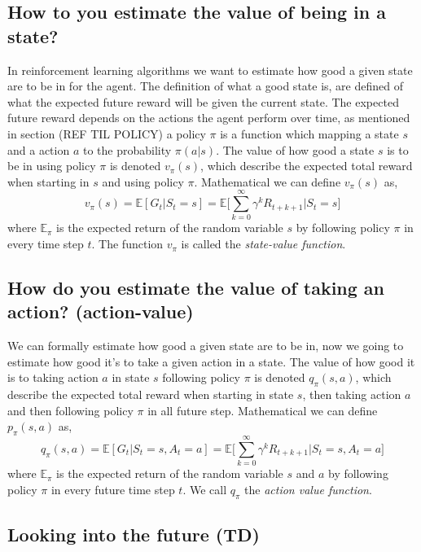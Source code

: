 \documentclass[11pt]{article}
\begin{document}
\subsection{How to you estimate the value of being in a state?}

In reinforcement learning algorithms we want to estimate how good a given state are to be in for the agent. The definition of what a good state is, are defined of what the expected future reward will be given the current state. The expected future reward depends on the actions the agent perform over time, as mentioned in section (REF TIL POLICY) a policy $\pi$ is a function which mapping a state $s$ and a action $a$ to the probability $\pi(a|s)$.
The value of how good a state $s$ is to be in using policy $\pi$ is denoted $v_{\pi}(s)$, which describe the expected total reward when starting in $s$ and using policy $\pi$. Mathematical we can define $v_{\pi}(s)$ as,
\begin{equation}
    v_{\pi}(s) = \mathds{E}[G_{t} | S_{t} = s] = \mathds{E}\bigg[\sum_{k = 0}^{\infty} \gamma^{k} R_{t + k + 1} \bigg| S_{t} = s \bigg]
\end{equation}
where $\mathds{E}_{\pi}$ is the expected return of the random variable $s$ by following policy $\pi$ in every time step $t$. The function $v_{\pi}$ is called the \textit{state-value function}.

\subsection{How do you estimate the value of taking an action? (action-value)}

We can formally estimate how good a given state are to be in, now we going to estimate how good it's to take a given action in a state. The value of how good it is to taking action $a$ in state $s$ following policy $\pi$ is denoted $q_{\pi}(s, a)$, which describe the expected total reward when starting in state $s$, then taking action $a$ and then following policy $\pi$ in all future step. Mathematical we can define $p_{\pi}(s, a)$ as,
\begin{equation}
    q_{\pi}(s, a) = \mathds{E}[G_{t} | S_{t} = s, A_{t} = a] = \mathds{E}\bigg[\sum_{k = 0}^{\infty} \gamma^{k} R_{t + k + 1} \bigg| S_{t} = s, A_{t} = a \bigg]
\end{equation}
where $\mathds{E}_{\pi}$ is the expected return of the random variable $s$ and $a$ by following policy $\pi$ in every future time step $t$. We call $q_{\pi}$ the \textit{action value function}.

\subsection{Looking into the future (TD)}



%
%
\end{document}
